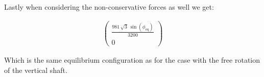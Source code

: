 
Lastly when considering the non-conservative forces as well we get:

\begin{equation}
    \begin{split}
        \left(\begin{array}{c} \frac{981\,\sqrt{3}\,\sin\left(\phi _{\mathrm{eq}}\right)}{3200}\\ 0 \end{array}\right)
    \end{split}
\end{equation}

Which is the same equilibrium configuration as for the case with the free rotation of the vertical shaft.%

